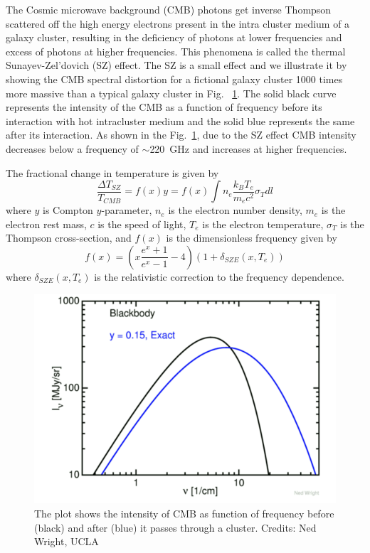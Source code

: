  The Cosmic microwave background (CMB) photons get inverse Thompson scattered off the high energy electrons present in the intra cluster medium of a galaxy cluster, resulting in the deficiency of photons at lower frequencies and excess of photons at higher frequencies. 
 This phenomena is called the thermal Sunayev-Zel'dovich (SZ) effect. 
 The SZ is a small effect and we illustrate it by showing the CMB spectral distortion for a fictional galaxy cluster 1000 times more massive than a typical galaxy cluster in Fig. ~\ref{ned_plot}. %
 The solid black curve represents the intensity of the CMB as a function of frequency before its interaction with hot intracluster medium and the solid blue represents the same after its interaction.
 As shown in the Fig.~\ref{ned_plot}, due to the SZ effect CMB intensity decreases below a frequency of $\sim$220 \,GHz and increases at higher frequencies. 
   
The fractional change in temperature is given by 
\begin{equation}
\label{eq:sz_eqn}
\frac{\Delta T_{SZ}}{T_{CMB}} = f(x) y = f(x) \int n_{e} \frac{k_{B}T_{e}}{m_{e}c^{2}} \sigma_{T} dl
\end{equation}
where $y$ is Compton $y$-parameter, $n_{e}$ is the electron number density, $m_{e}$ is the electron rest mass, $c$ is the speed of light,  $T_{e}$ is the electron temperature, $\sigma_{T}$ is the Thompson cross-section, and $f(x)$ is the dimensionless frequency given by
\begin{equation}
f(x) = (x\frac{e^{x}+1}{e^{x}-1} -4)(1 + \delta_{SZE}(x,T_{e}))
\end{equation} 
where $\delta_{SZE}(x,T_{e})$ is the relativistic correction to the frequency dependence.
\begin{figure}[ht]
\includegraphics[width=\linewidth]{figs/tSZ_effect_Ned.png}
\caption{The plot shows the intensity of CMB as function of frequency before (black) and after (blue) it passes through a cluster. Credits: {Ned Wright, UCLA} }
\label{ned_plot}
\end{figure}

